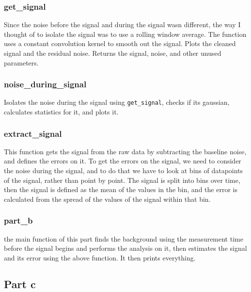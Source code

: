 \subsubsection{get\_signal}
Since the noise before the signal and during the signal wasn different, the way I thought of to isolate the signal was to use a rolling window average. The function uses a constant convolution kernel to smooth out the signal. Plots the cleaned signal and the residual noise. Returns the signal, noise, and other unused parameters.
\subsubsection{noise\_during\_signal}
Isolates the noise during the signal using \texttt{get\_signal}, checks if its gaussian, calculates statistics for it, and plots it.
\subsubsection{extract\_signal}
This function gets the signal from the raw data by subtracting the baseline noise, and defines the errors on it. To get the errors on the signal, we need to consider the noise during the signal, and to do that we have to look at bins of datapoints of the signal, rather than point by point. The signal is split into bins over time, then the signal is defined as the mean of the values in the bin, and the error is calculated from the spread of the values of the signal within that bin.
\subsubsection{part\_b}
the main function of this part finds the background using the measurement time before the signal begins and performs the analysis on it, then estimates the signal and its error using the above function. It then prints everything.
\subsection{Part c}
